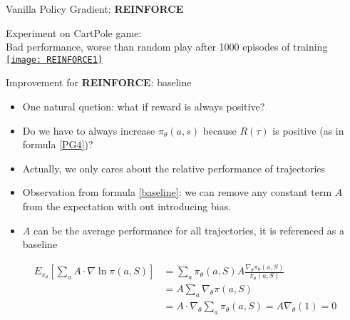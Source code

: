 \begin{frame}{Vanilla Policy Gradient: \textbf{REINFORCE}}
    \vspace{0.2cm}
    \begin{center}Experiment on CartPole game:\\Bad performance, worse than random play after 1000 episodes of training\\\href{https://www.youtube.com/watch?v=1bvTOM7Az3s}{\texttt{[image: REINFORCE1]}}\end{center}
\end{frame}

\begin{frame}{Improvement for \textbf{REINFORCE}: baseline}
    \begin{itemize}
        \item One natural quetion: what if reward is always positive? \\
        \item Do we have to always increase $\pi_{\theta}(a,s)$ because $R(\tau)$ is positive (as in formula \ref{PG4})?\\
        \item Actually, we only cares about the relative performance of trajectories\\
        \item Observation from formula \ref{baseline}: we can remove any constant term $A$ from the expectation with out introducing bias.
        \item $A$ can be the average performance for all trajectories, it is referenced as a baseline
    \end{itemize}
    \begin{equation}
        \label{baseline}
        \begin{split}
            E_{\pi_\theta}[\sum\limits_{a}A\cdot\nabla\ln\pi(a,S)] &= \sum\limits_{a}\pi_\theta(a,S)A\frac{\nabla_\theta\pi_\theta(a,S)}{\pi_\theta(a,S)}\\
                                                                   &= A \sum\limits_{a}\nabla_\theta\pi(a,S)\\
                                                                   &= A\cdot\nabla_\theta\sum\limits_{a}\pi_\theta(a,S)= A \nabla_\theta(1)= 0
        \end{split}
    \end{equation}
    
\end{frame}

